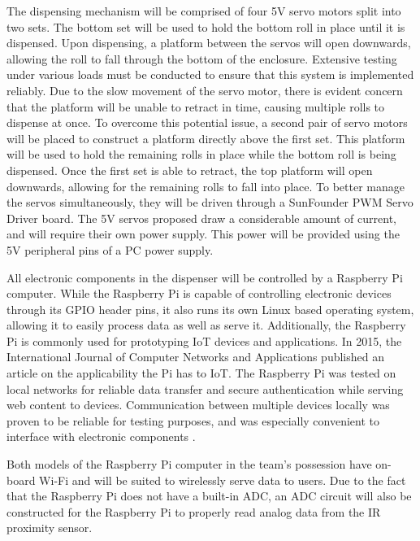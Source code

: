 \par The dispensing mechanism will be comprised of four 5V servo motors split into two sets. The bottom set will be used to hold the bottom roll in place until it is dispensed. Upon dispensing, a platform between the servos will open downwards, allowing the roll to fall through the bottom of the enclosure. Extensive testing under various loads must be conducted to ensure that this system is implemented reliably. Due to the slow movement of the servo motor, there is evident concern that the platform will be unable to retract in time, causing multiple rolls to dispense at once. To overcome this potential issue, a second pair of servo motors will be placed to construct a platform directly above the first set. This platform will be used to hold the remaining rolls in place while the bottom roll is being dispensed. Once the first set is able to retract, the top platform will open downwards, allowing for the remaining rolls to fall into place. To better manage the servos simultaneously, they will be driven through a SunFounder PWM Servo Driver board. The 5V servos proposed draw a considerable amount of current, and will require their own power supply. This power will be provided using the 5V peripheral pins of a PC power supply. 

\par All electronic components in the dispenser will be controlled by a Raspberry Pi computer. While the Raspberry Pi is capable of controlling electronic devices through its GPIO header pins, it also runs its own Linux based operating system, allowing it to easily process data as well as serve it. Additionally, the Raspberry Pi is commonly used for prototyping IoT devices and applications. In 2015, the International Journal of Computer Networks and Applications published an article on the applicability the Pi has to IoT. The Raspberry Pi was tested on local networks for reliable data transfer and secure authentication while serving web content to devices. Communication between multiple devices locally was proven to be reliable for testing purposes, and was especially convenient to interface with electronic components \cite{raspberry_pi_iot}.
\par Both models of the Raspberry Pi computer in the team's possession have on-board Wi-Fi and will be suited to wirelessly serve data to users. Due to the fact that the Raspberry Pi does not have a built-in ADC, an ADC circuit will also be constructed for the Raspberry Pi to properly read analog data from the IR proximity sensor. 

